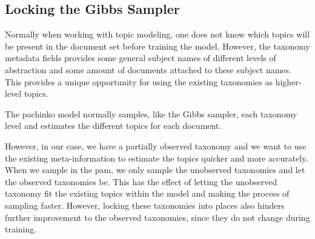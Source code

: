\subsection{Locking the Gibbs Sampler}\label{sec:appendix/locking}
Normally when working with topic modeling, one does not know which topics will be present in the document set before training the model.
However, the taxonomy metadata fields provides some general subject names of different levels of abstraction and some amount of documents attached to these subject names.
This provides a unique opportunity for using the existing taxonomies as higher-level topics.

The pachinko model normally samples, like the Gibbs sampler, each taxonomy level and estimates the different topics for each document.

However, in our case, we have a partially observed taxonomy and we want to use the existing meta-information to estimate the topics quicker and more accurately.
When we sample in the \gls{pam}, we only sample the unobserved taxonomies and let the observed taxonomies be. 
This has the effect of letting the unobserved taxonomy fit the existing topics within the model and making the process of sampling faster.
However, locking these taxonomies into places also hinders further improvement to the observed taxonomies, since they do not change during training.   
